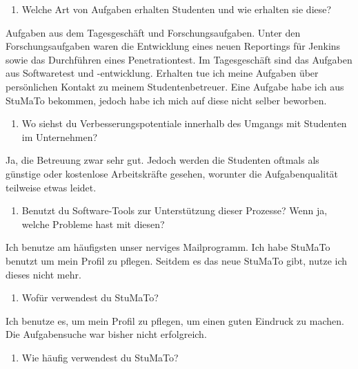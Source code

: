 \documentclass[
  12pt,
  ngerman,
  a4paper,
]{article}
\providecommand{\tightlist}{%
  \setlength{\itemsep}{0pt}\setlength{\parskip}{0pt}}
\begin{document}
\begin{enumerate}
\def\labelenumi{\arabic{enumi}.}
\setcounter{enumi}{6}
\tightlist
\item
  Welche Art von Aufgaben erhalten Studenten und wie erhalten sie diese?
\end{enumerate}

Aufgaben aus dem Tagesgeschäft und Forschungsaufgaben. Unter den
Forschungsaufgaben waren die Entwicklung eines neuen Reportings für
Jenkins sowie das Durchführen eines Penetrationtest. Im Tagesgeschäft
sind das Aufgaben aus Softwaretest und -entwicklung. Erhalten tue ich
meine Aufgaben über persönlichen Kontakt zu meinem Studentenbetreuer.
Eine Aufgabe habe ich aus StuMaTo bekommen, jedoch habe ich mich auf
diese nicht selber beworben.

\begin{enumerate}
\def\labelenumi{\arabic{enumi}.}
\setcounter{enumi}{7}
\tightlist
\item
  Wo siehst du Verbesserungspotentiale innerhalb des Umgangs mit
  Studenten im Unternehmen?
\end{enumerate}

Ja, die Betreuung zwar sehr gut. Jedoch werden die Studenten oftmals als
günstige oder kostenlose Arbeitskräfte gesehen, worunter die
Aufgabenqualität teilweise etwas leidet.

\begin{enumerate}
\def\labelenumi{\arabic{enumi}.}
\setcounter{enumi}{8}
\tightlist
\item
  Benutzt du Software-Tools zur Unterstützung dieser Prozesse? Wenn ja,
  welche Probleme hast mit diesen?
\end{enumerate}

Ich benutze am häufigsten unser nerviges Mailprogramm. Ich habe StuMaTo
benutzt um mein Profil zu pflegen. Seitdem es das neue StuMaTo gibt,
nutze ich dieses nicht mehr.

\begin{enumerate}
\def\labelenumi{\arabic{enumi}.}
\setcounter{enumi}{9}
\tightlist
\item
  Wofür verwendest du StuMaTo?
\end{enumerate}

Ich benutze es, um mein Profil zu pflegen, um einen guten Eindruck zu
machen. Die Aufgabensuche war bisher nicht erfolgreich.

\begin{enumerate}
\def\labelenumi{\arabic{enumi}.}
\setcounter{enumi}{10}
\tightlist
\item
  Wie häufig verwendest du StuMaTo?
\end{enumerate}
\end{document}
